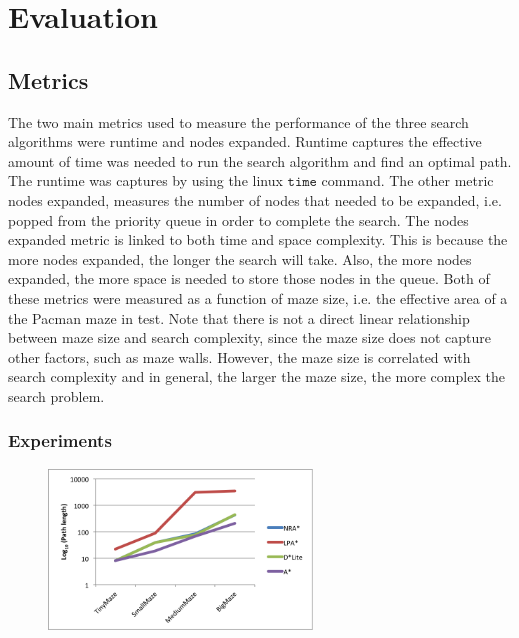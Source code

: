 

\section{Evaluation}\label{sec:eval}
	\subsection{Metrics}
    The two main metrics used to measure the performance of the three search algorithms were runtime and nodes expanded. Runtime captures the effective amount of time was needed to run the search algorithm and find an optimal path. The runtime was captures by using the linux $\texttt{time}$ command. The other metric nodes expanded, measures the number of nodes that needed to be expanded, i.e. popped from the priority queue in order to complete the search. The nodes expanded metric is linked to both time and space complexity. This is because the more nodes expanded, the longer the search will take. Also, the more nodes expanded, the more space is needed to store those nodes in the queue. Both of these metrics were measured as a function of maze size, i.e. the effective area of a the Pacman maze in test. Note that there is not a direct linear relationship between maze size and search complexity, since the maze size does not capture other factors, such as maze walls. However, the maze size is correlated with search complexity and in general, the larger the maze size, the more complex the search problem.
    
    \subsubsection{Experiments}
    
    \begin{figure}[htb!]
    	\centering
    	\includegraphics[width=7cm]{PathLength.png}
    	\caption{}
    	\label{fig:1}
    \end{figure}

